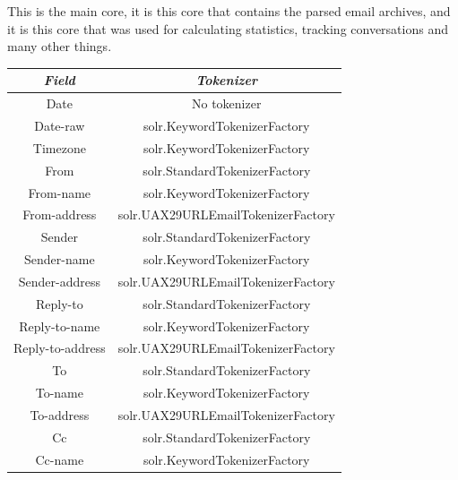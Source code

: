 \documentclass[a4paper,english]{report}
\begin{document}
This is the main core, it is this core that contains the parsed email archives, and it is this core that was used for calculating statistics, tracking conversations and many other things.

\begin{center}
 \begin{tabular}{||c | c||} 
 \hline
 \textit{Field} & \textit{Tokenizer} \\ [1ex] 
 \hline\hline
 Date & No tokenizer\\ 

 \hline
 Date-raw &  solr.KeywordTokenizerFactory\\

\hline
Timezone & solr.KeywordTokenizerFactory\\

\hline 
From & solr.StandardTokenizerFactory\\

\hline
From-name & solr.KeywordTokenizerFactory\\

\hline
From-address & solr.UAX29URLEmailTokenizerFactory\\

\hline 
Sender & solr.StandardTokenizerFactory\\

\hline
Sender-name & solr.KeywordTokenizerFactory\\

\hline
Sender-address & solr.UAX29URLEmailTokenizerFactory\\

\hline 
Reply-to & solr.StandardTokenizerFactory\\

\hline
Reply-to-name & solr.KeywordTokenizerFactory\\

\hline
Reply-to-address & solr.UAX29URLEmailTokenizerFactory\\

\hline 
To & solr.StandardTokenizerFactory\\

\hline
To-name & solr.KeywordTokenizerFactory\\

\hline
To-address & solr.UAX29URLEmailTokenizerFactory\\

\hline 
Cc & solr.StandardTokenizerFactory\\

\hline
Cc-name & solr.KeywordTokenizerFactory\\


\end{tabular}
\end{center}
\end{document}
